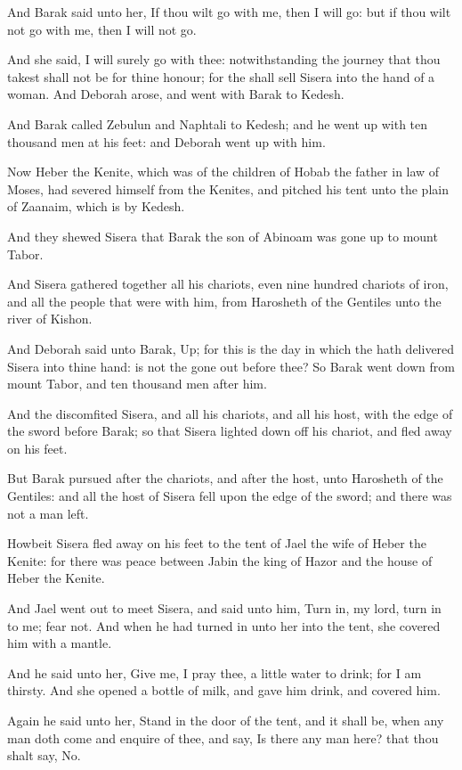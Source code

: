 \verse And Barak said unto her, If thou wilt go with me, then I will go: but if thou wilt not go with me, then I will not go.

\verse And she said, I will surely go with thee: notwithstanding the journey that thou takest shall not be for thine honour; for the \LORD shall sell Sisera into the hand of a woman. And Deborah arose, and went with Barak to Kedesh.

\verse And Barak called Zebulun and Naphtali to Kedesh; and he went up with ten thousand men at his feet: and Deborah went up with him.

\verse Now Heber the Kenite, which was of the children of Hobab the father in law of Moses, had severed himself from the Kenites, and pitched his tent unto the plain of Zaanaim, which is by Kedesh.

\verse And they shewed Sisera that Barak the son of Abinoam was gone up to mount Tabor.

\verse And Sisera gathered together all his chariots, even nine hundred chariots of iron, and all the people that were with him, from Harosheth of the Gentiles unto the river of Kishon.

\verse And Deborah said unto Barak, Up; for this is the day in which the \LORD hath delivered Sisera into thine hand: is not the \LORD gone out before thee? So Barak went down from mount Tabor, and ten thousand men after him.

\verse And the \LORD discomfited Sisera, and all his chariots, and all his host, with the edge of the sword before Barak; so that Sisera lighted down off his chariot, and fled away on his feet.

\verse But Barak pursued after the chariots, and after the host, unto Harosheth of the Gentiles: and all the host of Sisera fell upon the edge of the sword; and there was not a man left.

\verse Howbeit Sisera fled away on his feet to the tent of Jael the wife of Heber the Kenite: for there was peace between Jabin the king of Hazor and the house of Heber the Kenite.

\verse And Jael went out to meet Sisera, and said unto him, Turn in, my lord, turn in to me; fear not. And when he had turned in unto her into the tent, she covered him with a mantle.

\verse And he said unto her, Give me, I pray thee, a little water to drink; for I am thirsty. And she opened a bottle of milk, and gave him drink, and covered him.

\verse Again he said unto her, Stand in the door of the tent, and it shall be, when any man doth come and enquire of thee, and say, Is there any man here? that thou shalt say, No.

